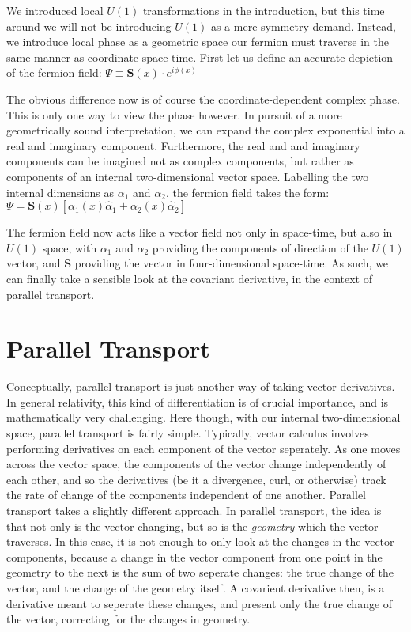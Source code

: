 \documentclass{article}
\begin{document}
        We introduced local $U(1)$ transformations in the introduction, but this time around we will not be introducing $U(1)$ as a mere symmetry demand. Instead, we introduce local phase as a geometric space our fermion must traverse in the same manner as coordinate space-time. First let us define an accurate depiction of the fermion field:
        $\Psi \equiv \mathbf{S}(x) \cdot e^{i \phi(x)}$

        The obvious difference now is of course the coordinate-dependent complex phase. This is only one way to view the phase however. In pursuit of a more geometrically sound interpretation, we can expand the complex exponential into a real and imaginary component. Furthermore, the real and and imaginary components can be imagined not as complex components, but rather as components of an internal two-dimensional vector space. Labelling the two internal dimensions as $\alpha_1$ and $\alpha_2$, the fermion field takes the form:
        $\Psi =  \mathbf{S}(x) \left[ \alpha_1(x) \hat\alpha_1 + \alpha_2(x) \hat\alpha_2 \right]$ 

        The fermion field now acts like a vector field not only in space-time, but also in $U(1)$ space, with $\alpha_1$ and $\alpha_2$ providing the components of direction of the $U(1)$ vector, and $\mathbf{S}$ providing the vector in four-dimensional space-time. As such, we can finally take a sensible look at the covariant derivative, in the context of parallel transport.


\section{Parallel Transport}
        Conceptually, parallel transport is just another way of taking vector derivatives. In general relativity, this kind of differentiation is of crucial importance, and is mathematically very challenging. Here though, with our internal two-dimensional space, parallel transport is fairly simple. Typically, vector calculus involves performing derivatives on each component of the vector seperately. As one moves across the vector space, the components of the vector change independently of each other, and so the derivatives (be it a divergence, curl, or otherwise) track the rate of change of the components independent of one another. Parallel transport takes a slightly different approach. In parallel transport, the idea is that not only is the vector changing, but so is the \textit{geometry} which the vector traverses. In this case, it is not enough to only look at the changes in the vector components, because a change in the vector component from one point in the geometry to the next is the sum of two seperate changes: the true change of the vector, and the change of the geometry itself. A covarient derivative then, is a derivative meant to seperate these changes, and present only the true change of the vector, correcting for the changes in geometry.
\end{document}
